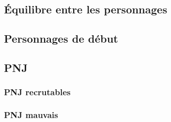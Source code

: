 \subsection{Équilibre entre les personnages}
\subsection{Personnages de début}
\subsection{PNJ}
\subsubsection{PNJ recrutables}
\subsubsection{PNJ mauvais}